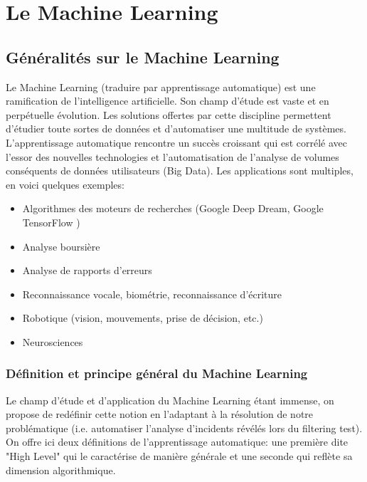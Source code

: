 \chapter{ Le  Machine Learning}
\label{Le Machine Learning}
\thispagestyle{fancy}




\section{Généralités sur le Machine Learning}
\label{Le Machine Learning: Généralités sur le Machine Learning}
Le Machine Learning (traduire par apprentissage automatique) est une ramification de l'intelligence artificielle. Son champ d'étude est vaste et en perpétuelle évolution. Les solutions offertes par cette discipline permettent d'étudier toute sortes de données et d'automatiser une multitude de systèmes. L'apprentissage automatique rencontre un succès croissant qui est corrélé avec l'essor des nouvelles technologies et l'automatisation de l'analyse de volumes conséquents de données utilisateurs (Big Data). Les applications sont multiples, en voici quelques exemples:  

\begin{itemize}
	\item Algorithmes des moteurs de recherches (Google Deep Dream\cite{DeepDream}, Google TensorFlow \cite{TensorFlow})
	\item Analyse boursière
	\item Analyse de rapports d'erreurs
	\item Reconnaissance vocale, biométrie, reconnaissance d'écriture
	\item Robotique (vision, mouvements, prise de décision, etc.)
	\item Neurosciences 
\end{itemize}



\subsection{Définition et principe général du Machine Learning}
\label{Le Machine Learning: Généralités sur le Machine Learning: Définition et principe général}
Le champ d'étude et d'application du Machine Learning étant immense, on propose de redéfinir cette notion en l'adaptant à la résolution de notre problématique (i.e. automatiser l'analyse d'incidents révélés lors du filtering test).
On offre ici deux définitions de l'apprentissage automatique: une première dite "High Level" qui le caractérise de manière générale et une seconde qui reflète sa dimension algorithmique. 


